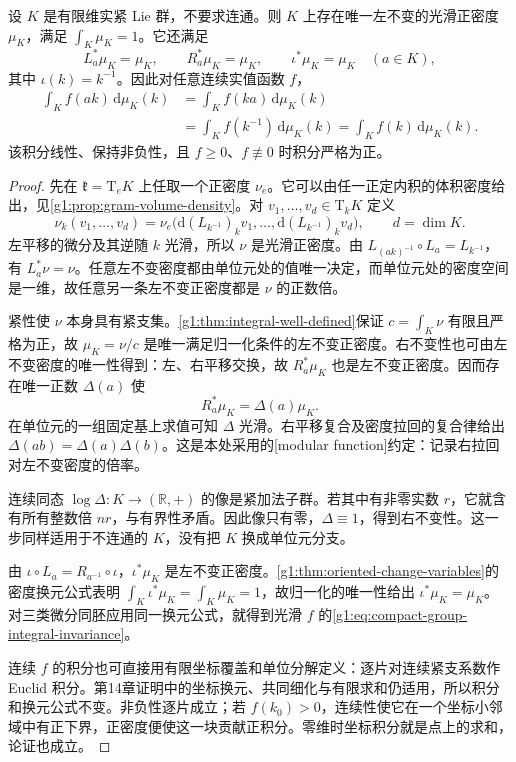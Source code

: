 \begin{theorem}\label{g1:thm:compact-group-integration}
	设 \(K\) 是有限维实紧 Lie 群，不要求连通。则 \(K\) 上存在唯一左不变的光滑正密度 \(\mu_K\)，满足 \(\int_K\mu_K=1\)。它还满足
	\[
		L_a^*\mu_K=\mu_K,\qquad R_a^*\mu_K=\mu_K,\qquad
		\iota^*\mu_K=\mu_K\quad(a\in K),
	\]
	其中 \(\iota(k)=k^{-1}\)。因此对任意连续实值函数 \(f\)，
	\begin{equation}\label{g1:eq:compact-group-integral-invariance}
		\begin{aligned}
			\int_K f(ak)\,\mathrm{d}\mu_K(k)
			&=\int_K f(ka)\,\mathrm{d}\mu_K(k)\\
			&=\int_K f(k^{-1})\,\mathrm{d}\mu_K(k)
			=\int_K f(k)\,\mathrm{d}\mu_K(k).
		\end{aligned}
	\end{equation}
	该积分线性、保持非负性，且 \(f\geq0\)、\(f\not\equiv0\) 时积分严格为正。
\end{theorem}
\begin{proof}
	先在 \(\mathfrak k=\mathrm{T}_eK\) 上任取一个正密度 \(\nu_e\)。它可以由任一正定内积的体积密度给出，见\cref{g1:prop:gram-volume-density}。对 \(v_1,\ldots,v_d\in \mathrm{T}_kK\) 定义
	\[
		\nu_k(v_1,\ldots,v_d)
		=\nu_e\bigl(\mathrm{d}(L_{k^{-1}})_kv_1,\ldots,
		\mathrm{d}(L_{k^{-1}})_kv_d\bigr),\qquad d=\dim K.
	\]
	左平移的微分及其逆随 \(k\) 光滑，所以 \(\nu\) 是光滑正密度。由 \(L_{(ak)^{-1}}\circ L_a=L_{k^{-1}}\)，有 \(L_a^*\nu=\nu\)。任意左不变密度都由单位元处的值唯一决定，而单位元处的密度空间是一维，故任意另一条左不变正密度都是 \(\nu\) 的正数倍。

	紧性使 \(\nu\) 本身具有紧支集。\cref{g1:thm:integral-well-defined}保证 \(c=\int_K\nu\) 有限且严格为正，故 \(\mu_K=\nu/c\) 是唯一满足归一化条件的左不变正密度。右不变性也可由左不变密度的唯一性得到：左、右平移交换，故 \(R_a^*\mu_K\) 也是左不变正密度。因而存在唯一正数 \(\Delta(a)\) 使
	\[
		R_a^*\mu_K=\Delta(a)\mu_K.
	\]
	在单位元的一组固定基上求值可知 \(\Delta\) 光滑。右平移复合及密度拉回的复合律给出 \(\Delta(ab)=\Delta(a)\Delta(b)\)。这是本处采用的[modular function]约定：记录右拉回对左不变密度的倍率。

	连续同态 \(\log\Delta:K\to(\mathbb R,+)\) 的像是紧加法子群。若其中有非零实数 \(r\)，它就含有所有整数倍 \(nr\)，与有界性矛盾。因此像只有零，\(\Delta\equiv1\)，得到右不变性。这一步同样适用于不连通的 \(K\)，没有把 \(K\) 换成单位元分支。

	由 \(\iota\circ L_a=R_{a^{-1}}\circ\iota\)，\(\iota^*\mu_K\) 是左不变正密度。\cref{g1:thm:oriented-change-variables}的密度换元公式表明 \(\int_K\iota^*\mu_K=\int_K\mu_K=1\)，故归一化的唯一性给出 \(\iota^*\mu_K=\mu_K\)。对三类微分同胚应用同一换元公式，就得到光滑 \(f\) 的\eqref{g1:eq:compact-group-integral-invariance}。

	连续 \(f\) 的积分也可直接用有限坐标覆盖和单位分解定义：逐片对连续紧支系数作 Euclid 积分。第14章证明中的坐标换元、共同细化与有限求和仍适用，所以积分和换元公式不变。非负性逐片成立；若 \(f(k_0)>0\)，连续性使它在一个坐标小邻域中有正下界，正密度便使这一块贡献正积分。零维时坐标积分就是点上的求和，论证也成立。
\end{proof}

